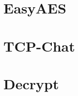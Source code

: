 \documentclass[a4paper,12bpt]{scrartcl}
\begin{document}
\section{EasyAES}
\label{sec:EasyAES}



\begin{appendices}
  \section{TCP-Chat}
  \label{sec:TCP-Chat}
  
  
  

  \section{Decrypt}
  \label{sec:Decrypt}
  
  

\end{appendices}
\end{document}
